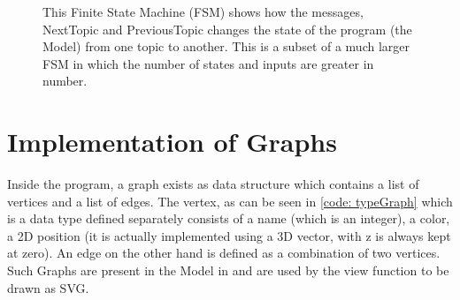 \begin{figure}[h] %
\centering %
\caption{This Finite State Machine (FSM) 
        shows how the messages, NextTopic and PreviousTopic
        changes the state of the program (the Model) from
        one topic to another. This is a subset of a much larger
        FSM in which the number of states and inputs are greater
        in number.
        }
\label{fig:my_label}
\end{figure}
\section{Implementation of Graphs}
Inside the program, a graph exists as data structure which contains a list of
vertices and a list of edges. The vertex, as can be seen in \autoref{code: typeGraph} which is a data type defined
separately consists of a name (which is an integer), a color, a 2D position (it
is actually implemented using a 3D vector, with z is always kept at zero).  An
edge on the other hand is defined as a combination of two vertices. Such Graphs
are present in the Model in and are used by the view function to be drawn as
SVG.

